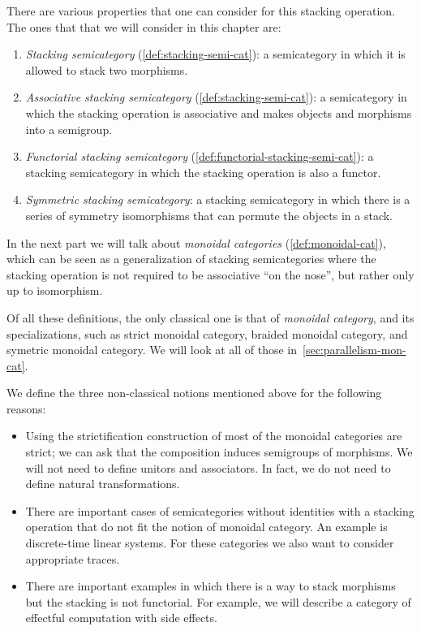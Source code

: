 There are various properties that one can consider for this stacking operation.
The ones that that we will consider in this chapter are:
%
\begin{enumerate}
	\item \emph{Stacking semicategory} (\cref{def:stacking-semi-cat}): a semicategory in which  it is allowed to stack two morphisms.
	\item \emph{Associative stacking semicategory} (\cref{def:stacking-semi-cat}): a semicategory in which the stacking operation is associative and makes objects and morphisms into a semigroup.
	\item \emph{Functorial stacking semicategory} (\cref{def:functorial-stacking-semi-cat}): a stacking semicategory in which the stacking operation is also a functor.
	\item \emph{Symmetric stacking semicategory}: a stacking semicategory in which there is a series of symmetry isomorphisms that can permute the objects in a stack.
\end{enumerate}
%
In the next part we will talk about \emph{monoidal categories} (\cref{def:monoidal-cat}), which can be seen as a generalization of stacking semicategories where the stacking operation is not required to be associative ``on the nose'', but rather only up to isomorphism.

\begin{remark}
	Of all these definitions, the only classical one is that of \emph{monoidal category}, and its specializations, such as strict monoidal category, braided monoidal category, and symetric monoidal category.
	We will look at all of those in~\cref{sec:parallelism-mon-cat}.

	We define the three non-classical notions mentioned above for the following reasons:
	\begin{itemize}
		\item Using the strictification construction of \SetL most of the monoidal categories are strict; we can ask that the composition induces semigroups of morphisms.
		      We will not need to define unitors and associators.
		      In fact, we do not need to define natural transformations.
		\item There are important cases of semicategories without identities with a stacking operation that do not fit the notion of monoidal category.
		      An example is discrete-time linear systems.
		      For these categories we also want to consider appropriate traces.
		\item There are important examples in which there is a way to stack morphisms but the stacking is not functorial.
		      For example, we will describe a category of effectful computation with side effects.
	\end{itemize}
\end{remark}

